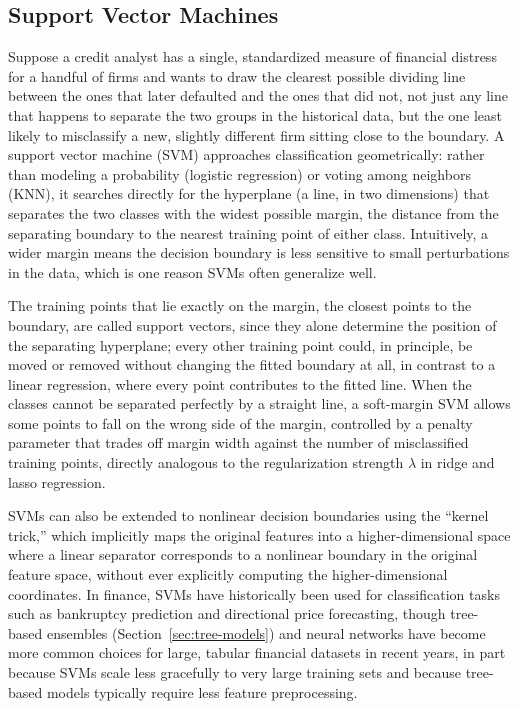 \documentclass[../ai_in_finance]{subfiles}
\begin{document}
\subsection{Support Vector Machines}

Suppose a credit analyst has a single, standardized measure of financial distress for a handful of firms and wants to draw the clearest possible dividing line between the ones that later defaulted and the ones that did not, not just any line that happens to separate the two groups in the historical data, but the one least likely to misclassify a new, slightly different firm sitting close to the boundary. A support vector machine (SVM) approaches classification geometrically: rather than modeling a probability (logistic regression) or voting among neighbors (KNN), it searches directly for the hyperplane (a line, in two dimensions) that separates the two classes with the widest possible margin, the distance from the separating boundary to the nearest training point of either class. Intuitively, a wider margin means the decision boundary is less sensitive to small perturbations in the data, which is one reason SVMs often generalize well.

The training points that lie exactly on the margin, the closest points to the boundary, are called support vectors, since they alone determine the position of the separating hyperplane; every other training point could, in principle, be moved or removed without changing the fitted boundary at all, in contrast to a linear regression, where every point contributes to the fitted line. When the classes cannot be separated perfectly by a straight line, a soft-margin SVM allows some points to fall on the wrong side of the margin, controlled by a penalty parameter that trades off margin width against the number of misclassified training points, directly analogous to the regularization strength $\lambda$ in ridge and lasso regression.

SVMs can also be extended to nonlinear decision boundaries using the ``kernel trick,'' which implicitly maps the original features into a higher-dimensional space where a linear separator corresponds to a nonlinear boundary in the original feature space, without ever explicitly computing the higher-dimensional coordinates. In finance, SVMs have historically been used for classification tasks such as bankruptcy prediction and directional price forecasting, though tree-based ensembles (Section~\ref{sec:tree-models}) and neural networks have become more common choices for large, tabular financial datasets in recent years, in part because SVMs scale less gracefully to very large training sets and because tree-based models typically require less feature preprocessing.
\end{document}
